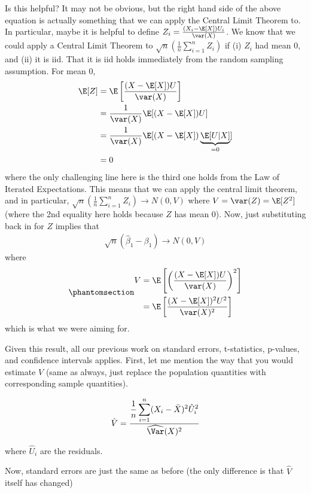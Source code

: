 \documentclass[
  letterpaper,
  DIV=11,
  numbers=noendperiod]{scrreprt}
\begin{document}
Is this helpful? It may not be obvious, but the right hand side of the
above equation is actually something that we can apply the Central Limit
Theorem to. In particular, maybe it is helpful to define
\(Z_i = \frac{(X_i - \E[X]) U_i}{\var(X)}\). We know that we could apply
a Central Limit Theorem to
\(\sqrt{n}\left( \frac{1}{n} \sum_{i=1}^n Z_i \right)\) if (i) \(Z_i\)
had mean 0, and (ii) it is iid. That it is iid holds immediately from
the random sampling assumption. For mean 0, \begin{align*}
  \E[Z] &= \E\left[ \frac{(X - \E[X]) U}{\var(X)}\right] \\
  &= \frac{1}{\var(X)} \E[(X - \E[X]) U] \\
  &= \frac{1}{\var(X)} \E[(X - \E[X]) \underbrace{\E[U|X]}_{=0}] \\
  &= 0
\end{align*} where the only challenging line here is the third one holds
from the Law of Iterated Expectations. This means that we can apply the
central limit theorem, and in particular,
\(\sqrt{n} \left( \frac{1}{n} \sum_{i=1}^n Z_i \right) \rightarrow N(0,V)\)
where \(V=\var(Z) = \E[Z^2]\) (where the 2nd equality here holds because
\(Z\) has mean 0). Now, just substituting back in for \(Z\) implies that
\begin{align*}
  \sqrt{n}(\hat{\beta}_1 - \beta_1) \rightarrow N(0,V)
\end{align*} where \begin{equation}\phantomsection\label{eq-V}{
\begin{aligned}
  V &= \E\left[ \left( \frac{(X - \E[X]) U}{\var(X)} \right)^2 \right] \nonumber \\
  &= \E\left[ \frac{(X - \E[X])^2 U^2}{\var(X)^2}\right] 
\end{aligned}
}\end{equation} which is what we were aiming for.

Given this result, all our previous work on standard errors,
t-statistics, p-values, and confidence intervals applies. First, let me
mention the way that you would estimate \(V\) (same as always, just
replace the population quantities with corresponding sample quantities).

\[
  \hat{V} = \frac{ \displaystyle \frac{1}{n} \sum_{i=1}^n (X_i - \bar{X})^2 \hat{U}_i^2}{\widehat{\Var}(X)^2}
\]

where \(\hat{U}_i\) are the residuals.

Now, standard errors are just the same as before (the only difference is
that \(\hat{V}\) itself has changed)
\end{document}

